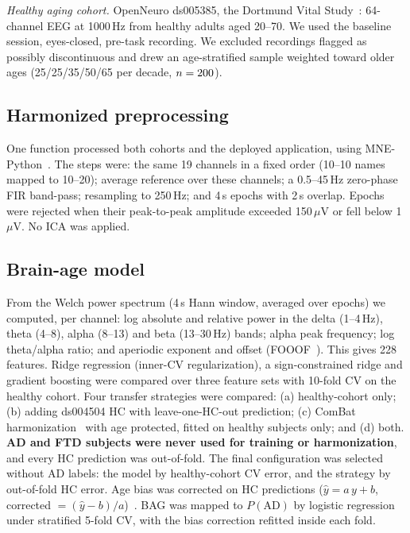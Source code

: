\documentclass[conference]{IEEEtran}
\begin{document}
\emph{Healthy aging cohort.} OpenNeuro ds005385, the Dortmund Vital Study~\cite{gajewski2022}: 64-channel EEG at 1000\,Hz from healthy adults aged 20--70. We used the baseline session, eyes-closed, pre-task recording. We excluded recordings flagged as possibly discontinuous and drew an age-stratified sample weighted toward older ages (25/25/35/50/65 per decade, $n=200{}$).

\subsection{Harmonized preprocessing}
One function processed both cohorts and the deployed application, using MNE-Python~\cite{mne}. The steps were: the same 19 channels in a fixed order (10--10 names mapped to 10--20); average reference over these channels; a 0.5--45\,Hz zero-phase FIR band-pass; resampling to 250\,Hz; and 4\,s epochs with 2\,s overlap. Epochs were rejected when their peak-to-peak amplitude exceeded 150\,$\mu$V or fell below 1\,$\mu$V. No ICA was applied.

\subsection{Brain-age model}
From the Welch power spectrum (4\,s Hann window, averaged over epochs) we computed, per channel: log absolute and relative power in the delta (1--4\,Hz), theta (4--8), alpha (8--13) and beta (13--30\,Hz) bands; alpha peak frequency; log theta/alpha ratio; and aperiodic exponent and offset (FOOOF~\cite{fooof}). This gives 228 features. Ridge regression (inner-CV regularization), a sign-constrained ridge and gradient boosting were compared over three feature sets with 10-fold CV on the healthy cohort. Four transfer strategies were compared: (a) healthy-cohort only; (b) adding ds004504 HC with leave-one-HC-out prediction; (c) ComBat harmonization~\cite{johnson2007,fortin2018} with age protected, fitted on healthy subjects only; and (d) both. \textbf{AD and FTD subjects were never used for training or harmonization}, and every HC prediction was out-of-fold. The final configuration was selected without AD labels: the model by healthy-cohort CV error, and the strategy by out-of-fold HC error. Age bias was corrected on HC predictions ($\hat{y}=a\,y+b$, corrected $=(\hat{y}-b)/a$)~\cite{delange2020}. BAG was mapped to $P(\mathrm{AD})$ by logistic regression under stratified 5-fold CV, with the bias correction refitted inside each fold.
\end{document}
